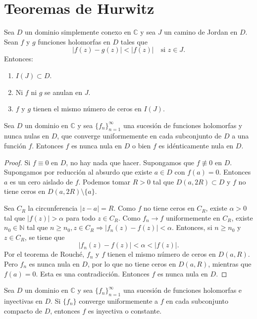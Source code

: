 \section{Teoremas de Hurwitz}
\begin{theorem}
    Sea $D$ un dominio simplemente conexo en $\mathbb{C}$ y sea $J$ un camino de Jordan en $D$.
    Sean $f$ y $g$ funciones holomorfas en $D$ tales que
    $$|f(z) - g(z)| < |f(z)| \quad \text{si } z \in J.$$
    Entonces:
    \begin{enumerate}
        \item $I(J) \subset D$.
        \item Ni $f$ ni $g$ se anulan en $J$.
        \item $f$ y $g$ tienen el mismo número de ceros en $I(J)$.
    \end{enumerate}
\end{theorem}

\begin{theorem}
    Sea $D$ un dominio en $\mathbb{C}$ y sea $\{f_n\}_{n=1}^\infty$ una sucesión de funciones holomorfas y nunca nulas en $D$, que converge uniformemente en cada subconjunto de $D$ a una función $f$.
    Entonces $f$ es nunca nula en $D$ o bien $f$ es idénticamente nula en $D$.
\end{theorem}

\begin{proof}
    Si $f \equiv 0$ en $D$, no hay nada que hacer.
    Supongamos que $f \not\equiv 0$ en $D$.
    Supongamos por reducción al absurdo que existe $a \in D$ con $f(a) = 0$.
    Entonces $a$ es un cero aislado de $f$.
    Podemos tomar $R > 0$ tal que $D(a, 2R) \subset D$ y $f$ no tiene ceros en $D(a, 2R) \setminus \{a\}$.

    Sea $C_R$ la circunferencia $|z-a| = R$.
    Como $f$ no tiene ceros en $C_R$, existe $\alpha > 0$ tal que $|f(z)| > \alpha$ para todo $z \in C_R$.
    Como $f_n \to f$ uniformemente en $C_R$, existe $n_0 \in \mathbb{N}$ tal que $n \geq n_0, z \in C_R \Rightarrow |f_n(z) - f(z)| < \alpha$.
    Entonces, si $n \geq n_0$ y $z \in C_R$, se tiene que
    $$|f_n(z) - f(z)| < \alpha < |f(z)|.$$
    Por el teorema de Rouché, $f_n$ y $f$ tienen el mismo número de ceros en $D(a, R)$.
    Pero $f_n$ es nunca nula en $D$, por lo que no tiene ceros en $D(a, R)$, mientras que $f(a) = 0$.
    Esta es una contradicción.
    Entonces $f$ es nunca nula en $D$.
\end{proof}

\begin{theorem}
    Sea $D$ un dominio en $\mathbb{C}$ y sea $\{f_n\}_{n=1}^\infty$ una sucesión de funciones holomorfas e inyectivas en $D$.
    Si $\{f_n\}$ converge uniformemente a $f$ en cada subconjunto compacto de $D$, entonces $f$ es inyectiva o constante.
\end{theorem}

